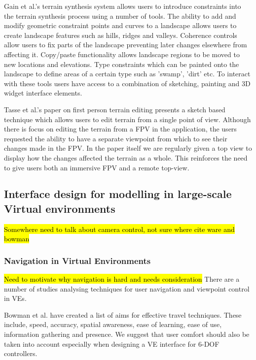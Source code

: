 \documentclass{sig-alternate-05-2015}
\begin{document}
 Gain et al.'s terrain synthesis system allows users to introduce constraints into the terrain synthesis process using a number of tools\cite{Gain2015}. The ability to add and modify geometric constraint points and curves to a landscape allows users to create landscape features such as hills, ridges and valleys.  Coherence controls allow users to fix parts of the landscape preventing later changes elsewhere from affecting it. Copy/paste functionality allows landscape regions to be moved to new locations and elevations. Type constraints which can be painted onto the landscape to define areas of a certain type such as 'swamp', 'dirt' etc. To interact with these tools users have access to a combination of sketching, painting and 3D widget interface elements. %

Tasse et al.'s paper on first person terrain editing presents a sketch based technique which allows users to  edit terrain from a single point of view\cite{Tasse2014}. Although there is focus on editing the terrain from a FPV in the application, the users requested the ability to have a separate viewpoint from which to see their changes made in the FPV. In the paper itself we are regularly given a top view to display how the changes affected the terrain as a whole. This reinforces the need to give users both an immersive FPV and a remote top-view.
\subsection{Interface design for modelling in large-scale Virtual environments}
\hl{Somewhere need to talk about camera control, not sure where cite ware and bowman}
\subsubsection{Navigation in Virtual Environments}
\hl{Need to motivate why navigation is hard and needs consideration}
There are a number of studies analysing techniques for user navigation and viewpoint control in VEs.

Bowman et al. have created a list of aims for effective travel techniques.\cite{Bowman1997} These include, speed, accuracy, spatial awareness, ease of learning, ease of use, information gathering and presence. We suggest that user comfort should also be taken into account especially when designing a VE interface for 6-DOF controllers.
\end{document}
